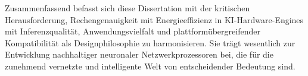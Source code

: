 \documentclass{article}
\begin{document}
	Zusammenfassend befasst sich diese Dissertation mit der kritischen Herausforderung, Rechengenauigkeit mit Energieeffizienz in KI-Hardware-Engines mit Inferenzqualität, Anwendungsvielfalt und plattformübergreifender Kompatibilität als Designphilosophie zu harmonisieren. Sie trägt wesentlich zur Entwicklung nachhaltiger neuronaler Netzwerkprozessoren bei, die für die zunehmend vernetzte und intelligente Welt von entscheidender Bedeutung sind.
\end{document}
